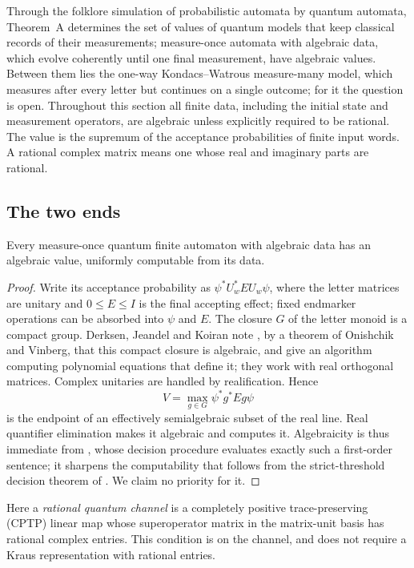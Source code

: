 \documentclass[11pt]{article}
\theoremstyle{plain}
\theoremstyle{definition}
\theoremstyle{remark}
\begin{document}
Through the folklore simulation of probabilistic automata by quantum automata, Theorem~A determines the set of values of quantum models that keep classical records of their measurements; measure-once automata with algebraic data, which evolve coherently until one final measurement, have algebraic values. Between them lies the one-way Kondacs--Watrous measure-many model, which measures after every letter but continues on a single outcome; for it the question is open. Throughout this section all finite data, including the initial state and measurement operators, are algebraic unless explicitly required to be rational. The value is the supremum of the acceptance probabilities of finite input words. A rational complex matrix means one whose real and imaginary parts are rational.

\subsection{The two ends}

\begin{proposition}\label{prop:mo}
Every measure-once quantum finite automaton with algebraic data has an algebraic value, uniformly computable from its data.
\end{proposition}

\begin{proof}
Write its acceptance probability as $\psi^*U_w^*EU_w\psi$, where the letter matrices are unitary and $0\le E\le I$ is the final accepting effect; fixed endmarker operations can be absorbed into $\psi$ and $E$. The closure $G$ of the letter monoid is a compact group. Derksen, Jeandel and Koiran note \cite[Section~2.2]{DJK05}, by a theorem of Onishchik and Vinberg, that this compact closure is algebraic, and give an algorithm \cite[Section~3]{DJK05} computing polynomial equations that define it; they work with real orthogonal matrices. Complex unitaries are handled by realification. Hence
\[
 V=\max_{g\in G}\psi^*g^*Eg\psi
\]
is the endpoint of an effectively semialgebraic subset of the real line. Real quantifier elimination makes it algebraic and computes it. Algebraicity is thus immediate from \cite[Section~2.2]{DJK05}, whose decision procedure evaluates exactly such a first-order sentence; it sharpens the computability that follows from the strict-threshold decision theorem of \cite{BJKP05}. We claim no priority for it.
\end{proof}

Here a \emph{rational quantum channel} is a completely positive trace-preserving (CPTP) linear map whose superoperator matrix in the matrix-unit basis has rational complex entries. This condition is on the channel, and does not require a Kraus representation with rational entries.
\end{document}
